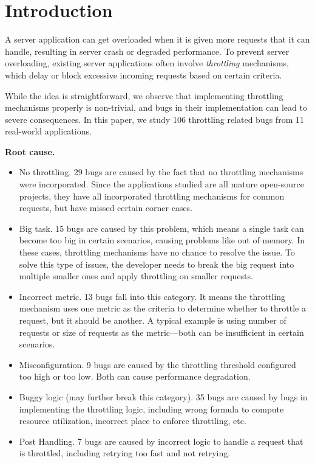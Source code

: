 \section{Introduction}

A server application can get overloaded when it is given more requests that it can handle,
resulting in server crash or degraded performance. To prevent server overloading, existing 
server applications often involve \emph{throttling} mechanisms, which delay or block
excessive incoming requests based on certain criteria.

While the idea is straightforward, we observe that implementing throttling mechanisms
properly is non-trivial, and bugs in their implementation can lead to severe consequences.
In this paper, we study 106 throttling related bugs from 11 real-world applications.

\vspace{.05in}
\noindent
\textbf{Root cause.} 

\begin{itemize}

\item No throttling. 29 bugs are caused by the fact that no throttling mechanisms
were incorporated. Since the applications studied are all mature open-source projects,
they have all incorporated throttling mechanisms for common requests, but have missed
certain corner cases. 

\item Big task. 15 bugs are caused by this problem, which means a single task can
become too big in certain scenarios, causing problems like out of memory. In these cases, throttling mechanisms
have no chance to resolve the issue. To solve this type of issues, the developer needs to
break the big request into multiple smaller ones and apply throttling on smaller requests.

\item Incorrect metric. 13 bugs fall into this category. It means the throttling mechanism uses
one metric as the criteria to determine whether to throttle a request, but it should be another. A
typical example is using number of requests or size of requests as the metric---both can be 
insufficient in certain scenarios.

\item Misconfiguration. 9 bugs are caused by the throttling threshold configured too high or too
low. Both can cause performance degradation.

\item Buggy logic (may further break this category).
35 bugs are caused by bugs in implementing the throttling logic, including
wrong formula to compute resource utilization, incorrect place to enforce throttling, etc.

\item Post Handling. 7 bugs are caused by incorrect logic to handle a request that is
throttled, including retrying too fast and not retrying.

\end{itemize}

